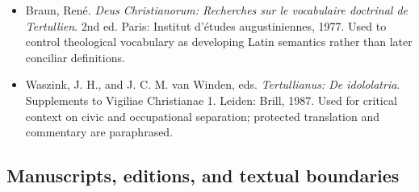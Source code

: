 \begin{itemize}
\item Braun, Ren\'e. \emph{Deus Christianorum: Recherches sur le vocabulaire
doctrinal de Tertullien}. 2nd ed. Paris: Institut d'\'etudes augustiniennes,
1977. Used to control theological vocabulary as developing Latin semantics
rather than later conciliar definitions.

\item Waszink, J. H., and J. C. M. van Winden, eds. \emph{Tertullianus: De
idololatria}. Supplements to Vigiliae Christianae 1. Leiden: Brill, 1987. Used
for critical context on civic and occupational separation; protected
translation and commentary are paraphrased.
\end{itemize}

\subsection{Manuscripts, editions, and textual boundaries}

